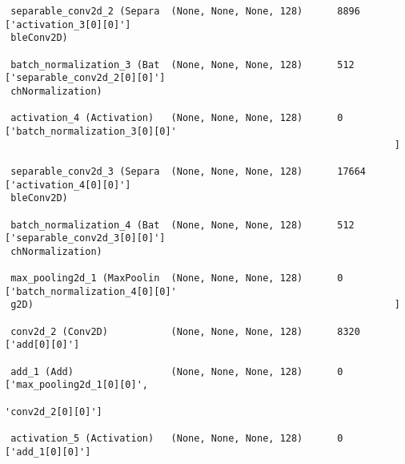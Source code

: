 \documentclass[
  letterpaper,
  DIV=11,
  numbers=noendperiod]{scrreprt}
\begin{document}
\begin{verbatim}
 separable_conv2d_2 (Separa  (None, None, None, 128)      8896      ['activation_3[0][0]']        
 bleConv2D)                                                                                       
                                                                                                  
 batch_normalization_3 (Bat  (None, None, None, 128)      512       ['separable_conv2d_2[0][0]']  
 chNormalization)                                                                                 
                                                                                                  
 activation_4 (Activation)   (None, None, None, 128)      0         ['batch_normalization_3[0][0]'
                                                                    ]                             
                                                                                                  
 separable_conv2d_3 (Separa  (None, None, None, 128)      17664     ['activation_4[0][0]']        
 bleConv2D)                                                                                       
                                                                                                  
 batch_normalization_4 (Bat  (None, None, None, 128)      512       ['separable_conv2d_3[0][0]']  
 chNormalization)                                                                                 
                                                                                                  
 max_pooling2d_1 (MaxPoolin  (None, None, None, 128)      0         ['batch_normalization_4[0][0]'
 g2D)                                                               ]                             
                                                                                                  
 conv2d_2 (Conv2D)           (None, None, None, 128)      8320      ['add[0][0]']                 
                                                                                                  
 add_1 (Add)                 (None, None, None, 128)      0         ['max_pooling2d_1[0][0]',     
                                                                     'conv2d_2[0][0]']            
                                                                                                  
 activation_5 (Activation)   (None, None, None, 128)      0         ['add_1[0][0]']               
                                                                                                  

\end{verbatim}
\end{document}
